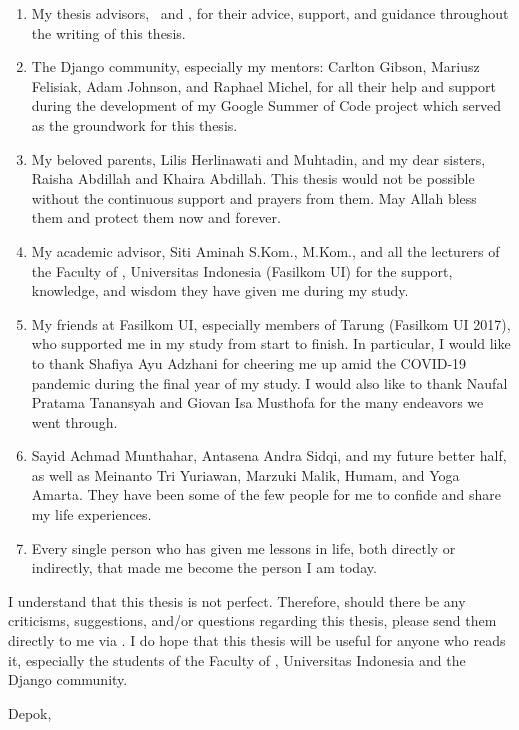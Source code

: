\begin{enumerate}
    \item My thesis advisors, \pembimbingSatu\ and \pembimbingDua, for their
          advice, support, and guidance throughout the writing of this thesis.
    \item The Django community, especially my mentors: Carlton Gibson, Mariusz
          Felisiak, Adam Johnson, and Raphael Michel, for all their help and
          support during the development of my Google Summer of Code project
          which served as the groundwork for this thesis.
    \item My beloved parents, Lilis Herlinawati and Muhtadin, and my dear
          sisters, Raisha Abdillah and Khaira Abdillah. This thesis would not
          be possible without the continuous support and prayers from them. May
          Allah bless them and protect them now and forever.
    \item My academic advisor, Siti Aminah S.Kom., M.Kom., and all the
          lecturers of the Faculty of \fakultas, Universitas Indonesia
          (Fasilkom UI) for the support, knowledge, and wisdom they have given
          me during my study.
    \item My friends at Fasilkom UI, especially members of Tarung (Fasilkom UI
          2017), who supported me in my study from start to finish. In
          particular, I would like to thank Shafiya Ayu Adzhani for cheering me
          up amid the COVID-19 pandemic during the final year of my study. I
          would also like to thank Naufal Pratama Tanansyah and Giovan Isa
          Musthofa for the many endeavors we went through.
    \item Sayid Achmad Munthahar, Antasena Andra Sidqi, and my future better
          half, as well as Meinanto Tri Yuriawan, Marzuki Malik, Humam, and
          Yoga Amarta. They have been some of the few people for me to confide
          and share my life experiences.
    \item Every single person who has given me lessons in life, both directly
          or indirectly, that made me become the person I am today.
\end{enumerate}

I understand that this thesis is not perfect. Therefore, should there be any
criticisms, suggestions, and/or questions regarding this thesis, please send
them directly to me via
. I do hope
that this thesis will be useful for anyone who reads it, especially the
students of the Faculty of \fakultas, Universitas Indonesia and the Django
community.

\vspace*{0.1cm}
\begin{flushright}
Depok, \tanggalSiapSidang\\[0.1cm]
\vspace*{1.5cm}
\penulis

\end{flushright}
